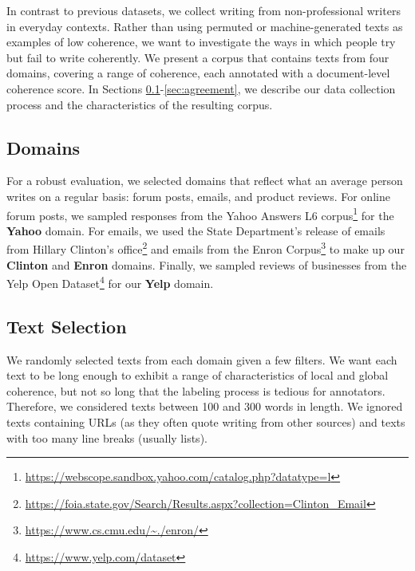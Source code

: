 \documentclass[11pt,a4paper]{article}
\begin{document}
In contrast to previous datasets, we collect writing from non-professional writers in everyday contexts. Rather than using permuted or machine-generated texts as examples of low coherence, we want to investigate the ways in which people try but fail to write coherently. We present a corpus that contains texts from four domains, covering a range of coherence, each annotated with a document-level coherence score. In Sections \ref{sec:domains}-\ref{sec:agreement}, we describe our data collection process and the characteristics of the resulting corpus. 



\subsection{Domains}
\label{sec:domains}



For a robust evaluation, we selected domains that reflect what an average person writes on a regular basis: forum posts, emails, and product reviews.  For online forum posts, we sampled responses from the Yahoo Answers L6 corpus\footnote{\url{https://webscope.sandbox.yahoo.com/catalog.php?datatype=l}} for the \textbf{Yahoo} domain.  For emails, we used the State Department's release of emails from Hillary Clinton's office\footnote{\url{https://foia.state.gov/Search/Results.aspx?collection=Clinton_Email}} and emails from the Enron Corpus\footnote{\url{https://www.cs.cmu.edu/~./enron/}} to make up our \textbf{Clinton} and \textbf{Enron} domains.  Finally, we sampled reviews of businesses from the Yelp Open Dataset\footnote{\url{https://www.yelp.com/dataset}} for our \textbf{Yelp} domain. 



\subsection{Text Selection}

We randomly selected texts from each domain given a few filters.  We want each text to be long enough to exhibit a range of characteristics of local and global coherence, but not so long that the labeling process is tedious for annotators. Therefore, we considered texts between 100 and 300 words in length. We ignored texts containing URLs (as they often quote writing from other sources) and texts with too many line breaks (usually lists).  
\end{document}
